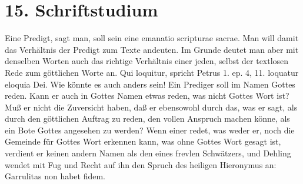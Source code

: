 \section{15. Schriftstudium}

Eine Predigt, sagt man, soll sein eine emanatio scripturae sacrae. Man will damit das Verhältnis der Predigt zum Texte andeuten. Im Grunde deutet man aber mit denselben Worten auch das richtige Verhältnis einer jeden, selbst der textlosen Rede zum göttlichen Worte an. Qui loquitur, spricht Petrus 1. ep. 4, 11. loquatur eloquia Dei. Wie könnte es auch anders sein! Ein Prediger soll im Namen Gottes reden. Kann er auch in Gottes Namen etwas reden, was nicht Gottes Wort ist? Muß er nicht die Zuversicht haben, daß er ebensowohl durch das, was er sagt, als durch den göttlichen Auftrag zu reden, den vollen Anspruch machen könne, als ein Bote Gottes angesehen zu werden? Wenn einer redet, was weder er, noch die Gemeinde für Gottes Wort erkennen kann, was ohne Gottes Wort gesagt ist, verdient er keinen andern Namen als den eines frevlen Schwätzers, und Dehling wendet mit Fug und Recht auf ihn
den Spruch des heiligen Hieronymus an: Garrulitas non habet fidem.

